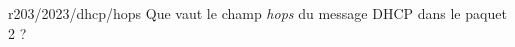 \begin{question}{r203/2023/dhcp/hops}
  Que vaut le champ {\em hops} du message DHCP dans le paquet 2 ?
  \begin{reponses}
    \lastchoices
  \end{reponses}
\end{question}
